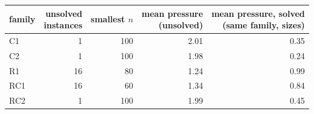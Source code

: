 \begin{tabular}{lrrrr}\toprule
family & \shortstack{unsolved\\instances} & smallest $n$ & \shortstack{mean pressure\\(unsolved)} & \shortstack{mean pressure, solved\\(same family, sizes)} \\ \midrule
C1 & 1 & 100 & 2.01 & 0.35 \\
C2 & 1 & 100 & 1.98 & 0.24 \\
R1 & 16 & 80 & 1.24 & 0.99 \\
RC1 & 16 & 60 & 1.34 & 0.84 \\
RC2 & 1 & 100 & 1.99 & 0.45 \\
\bottomrule\end{tabular}

